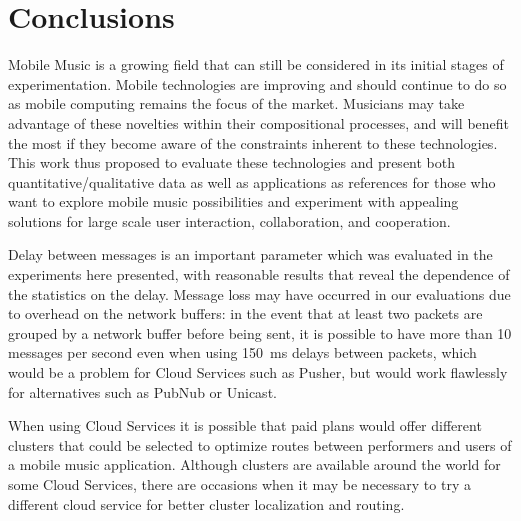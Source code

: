 \chapter{Conclusions}
\label{cap:conclusions}




Mobile Music is a growing field that can still be considered in its initial stages of experimentation.
Mobile technologies are improving and should continue to do so as mobile computing remains the focus of the market.
Musicians may take advantage of these novelties within their compositional processes, and will benefit the most if they become aware of the constraints inherent to these technologies.
This work thus proposed to evaluate these technologies and present both quantitative/qualitative data as well as applications as references for those who want to explore mobile music possibilities and experiment with appealing solutions for large scale user interaction, collaboration, and cooperation. 

Delay between messages is an important parameter which was evaluated in the experiments here presented, with reasonable results that reveal the dependence of the statistics on the delay.
Message loss may have occurred in our evaluations due to overhead on the network buffers:
in the event that at least two packets are grouped by a network buffer before being sent, it is possible to have more than 10 messages per second even when using 150~ms delays between packets, which would be a problem for Cloud Services such as Pusher, but would work flawlessly for alternatives such as PubNub or Unicast.

When using Cloud Services it is possible that paid plans would offer different clusters that could be selected to optimize routes between performers and users of a mobile music application.
Although clusters are available around the world for some Cloud Services, there are occasions when it may be necessary to try a different cloud service for better cluster localization and routing.

